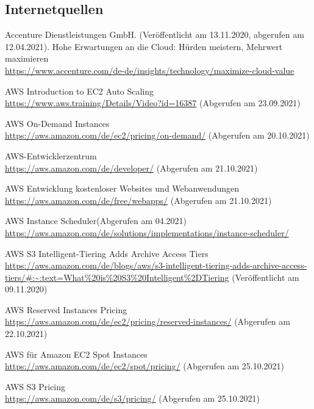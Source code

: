 \subsection{Internetquellen}
\begin{thebibliography}{HR08} %
  Accenture Dienstleistungen GmbH. (Veröffentlicht am 13.11.2020, abgerufen am 12.04.2021). Hohe Erwartungen an die Cloud: Hürden meistern, Mehrwert maximieren \\
  \url{https://www.accenture.com/de-de/insights/technology/maximize-cloud-value}

  AWS Introduction to EC2 Auto Scaling\\
  \url{https://www.aws.training/Details/Video?id=16387}
  (Abgerufen am 23.09.2021)

  AWS On-Demand Instances \\
  \url{https://aws.amazon.com/de/ec2/pricing/on-demand/}
  (Abgerufen am 20.10.2021)

  AWS-Entwicklerzentrum \\
  \url{https://aws.amazon.com/de/developer/}
  (Abgerufen am 21.10.2021)

  AWS Entwicklung kostenloser Websites
  und Webanwendungen   \\
  \url{https://aws.amazon.com/de/free/webapps/}
  (Abgerufen am 21.10.2021)

   AWS Instance Scheduler(Abgerufen am 04.2021)\\
  \url{https://aws.amazon.com/de/solutions/implementations/instance-scheduler/}

   AWS S3 Intelligent-Tiering Adds Archive Access Tiers \\
  \url{https://aws.amazon.com/de/blogs/aws/s3-intelligent-tiering-adds-archive-access-tiers/#:~:text=What%20is%20S3%20Intelligent%2DTiering}
  (Veröffentlicht am 09.11.2020)

  AWS Reserved Instances Pricing\\
  \url{https://aws.amazon.com/de/ec2/pricing/reserved-instances/}
  (Abgerufen am 22.10.2021)

   AWS für Amazon EC2 Spot Instances\\
  \url{https://aws.amazon.com/de/ec2/spot/pricing/}
  (Abgerufen am 25.10.2021)

   AWS S3 Pricing\\
  \url{https://aws.amazon.com/de/s3/pricing/}
  (Abgerufen am 25.10.2021)


\end{thebibliography}

